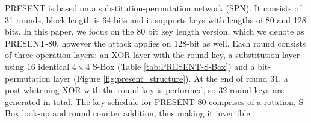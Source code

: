 \documentclass[10pt, conference, compsocconf]{IEEEtran}  %
\numberwithin{Definition}{section}
\numberwithin{Claim}{section}
\begin{document}

PRESENT  is based  on a substitution-permutation network (SPN).  It  consists  of 31 rounds, block length is 64 bits and it supports keys with lengths of 80 and 128 bits. In this paper, we focus on the 80 bit key length version, which we denote as PRESENT-80, however the attack applies on 128-bit as well. %
Each  round  consists  of  three operation layers: an XOR-layer with  the  round key, a substitution layer using $16$ identical $4\times 4$ S-Box (Table \ref{tab:PRESENT-S-Box}) and a bit-permutation layer (Figure \ref{fig:present_structure}). At the end of round 31, a post-whitening XOR with the round key is performed, so 32  round  keys are generated in total. The key schedule for PRESENT-80 comprises of a rotation, S-Box look-up and round counter addition, thus making it invertible.
\end{document}

